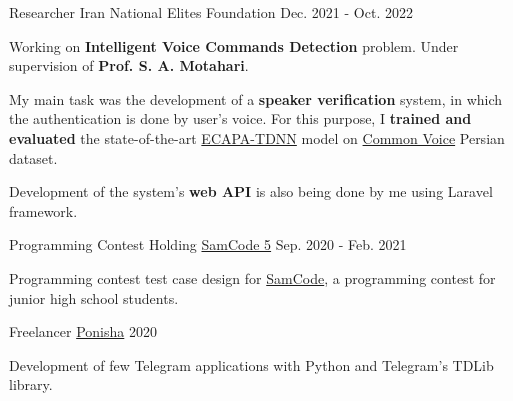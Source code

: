 

\begin{cventries}

  \cventry
    {Researcher} %
    {Iran National Elites Foundation} %
    {} %
    {Dec. 2021 - Oct. 2022} %
    {
      \begin{cvitems} %
        \item {Working on \textbf{Intelligent Voice Commands Detection} problem. Under supervision of \textbf{Prof. S. A. Motahari}.}
        \item {My main task was the development of a \textbf{speaker verification} system, in which the authentication is done by user's voice. For this purpose, I \textbf{trained and evaluated} the state-of-the-art \href{https://arxiv.org/abs/2005.07143}{ECAPA-TDNN} model on \href{https://commonvoice.mozilla.org}{Common Voice} Persian dataset.}
        \item{Development of the system's \textbf{web API} is also being done by me using Laravel framework.}
      \end{cvitems}
    }

  \cventry
    {Programming Contest Holding} %
    {\href{https://samcode.allamehelli3.ir/staff.html}{SamCode 5}} %
    {} %
    {Sep. 2020 - Feb. 2021} %
    {
      \begin{cvitems} %
        \item {Programming contest test case design for {\href{https://samcode.allamehelli3.ir/}{SamCode}}, a programming contest for junior high school students.}
      \end{cvitems}
    }

  \cventry
    {Freelancer} %
    {\href{https://ponisha.ir/profile/radinshayanfar}{Ponisha}} %
    {} %
    {2020} %
    {
      \begin{cvitems} %
        \item {Development of few Telegram applications with Python and Telegram's TDLib library.}
      \end{cvitems}
    }

\end{cventries}

